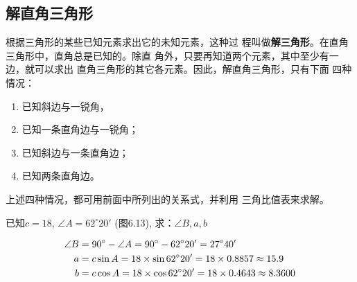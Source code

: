 \subsection{解直角三角形}
根据三角形的某些已知元素求出它的未知元素，这种过
程叫做\textbf{解三角形}。在直角三角形中，直角总是已知的。除直
角外，只要再知道两个元素，其中至少有一边，就可以求出
直角三角形的其它各元素。因此，解直角三角形，只有下面
四种情况：
\begin{enumerate}
    \item 已知斜边与一锐角，
    \item 已知一条直角边与一锐角；
    \item 已知斜边与一条直角边；
    \item 已知两条直角边。
\end{enumerate}

上述四种情况，都可用前面中所列出的关系式，并利用
三角比值表来求解。

\begin{example}
    已知$c=18$, $\angle A=62^{\circ}20'$ (图6.13),
求：$\angle B, a, b$
\end{example}

\begin{solution}
\[\begin{split}
    \angle B&=90^{\circ}-\angle A=90^{\circ}-62^{\circ}20'
=27^{\circ}40'\\
a&=c\sin A=18\times \sin62^{\circ}20'=18\times0.8857
\approx 15.9\\
b&=c\cos A=18\times\cos62^{\circ}20'=18\times0.4643\approx 8.3600
\end{split}\]
\end{solution}

\begin{figure}[htp]\centering
    \begin{minipage}[t]{0.48\textwidth}
    \centering
{}
    \caption{}
    \end{minipage}
    \begin{minipage}[t]{0.48\textwidth}
    \centering
    \caption{}
    \end{minipage}
    \end{figure}

